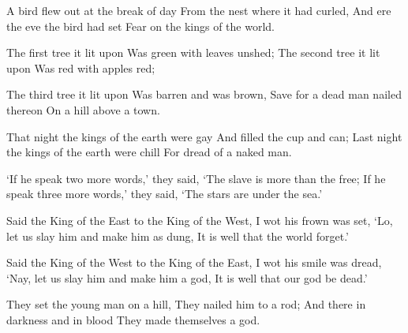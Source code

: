 \documentclass[fontsize=9, a5paper]{scrbook}
\begin{document}
\pagebreak


\begin{poem}
	\begin{stanza}
		A bird flew out at the break of day\verseline
		From the nest where it had curled,\verseline
		And ere the eve the bird had set\verseline
		Fear on the kings of the world.
	\end{stanza}
	
	\begin{stanza}
		The first tree it lit upon\verseline
		Was green with leaves unshed;\verseline
		The second tree it lit upon\verseline
		Was red with apples red;
	\end{stanza}
	
	\begin{stanza}
		The third tree it lit upon\verseline
		Was barren and was brown,\verseline
		Save for a dead man nailed thereon\verseline
		On a hill above a town.
	\end{stanza}
	
	\begin{stanza}
		That night the kings of the earth were gay\verseline
		And filled the cup and can;\verseline
		Last night the kings of the earth were chill\verseline
		For dread of a naked man.
	\end{stanza}
	
	\begin{stanza}
		‘If he speak two more words,’ they said,\verseline
		‘The slave is more than the free;\verseline
		If he speak three more words,’ they said,\verseline
		‘The stars are under the sea.’
	\end{stanza}
	
	\begin{stanza}
		Said the King of the East to the King of the West,\verseline
		I wot his frown was set,\verseline
		‘Lo, let us slay him and make him as dung,\verseline
		It is well that the world forget.’
	\end{stanza}
	
	\begin{stanza}
		Said the King of the West to the King of the East,\verseline
		I wot his smile was dread,\verseline
		‘Nay, let us slay him and make him a god,\verseline
		It is well that our god be dead.’
	\end{stanza}
	
	\begin{stanza}
		They set the young man on a hill,\verseline
		They nailed him to a rod;\verseline
		And there in darkness and in blood\verseline
		They made themselves a god.
	\end{stanza}
	

\end{poem}
\end{document}
